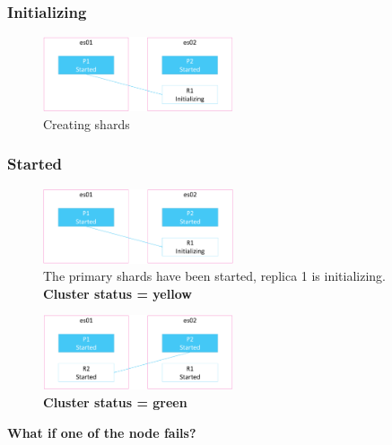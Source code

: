 \documentclass{article}
\begin{document}
\subsubsection{Initializing}

\begin{figure}[H]
    \centering
    \includegraphics[width=0.5\textwidth]{shard-alloc-initializing.png}
    \caption{Creating shards}
\end{figure}

\subsubsection{Started}

\begin{figure}[H]
    \centering
    \includegraphics[width=0.5\textwidth]{shard-alloc-started.png}
    \caption{The primary shards have been started, replica 1 is initializing. \textbf{Cluster status = yellow}}
\end{figure}
\begin{figure}[H]
    \centering
    \includegraphics[width=0.5\textwidth]{shard-alloc-started2.png}
    \caption{\textbf{Cluster status = green}}
\end{figure}

\textbf{What if one of the node fails?}
\end{document}
